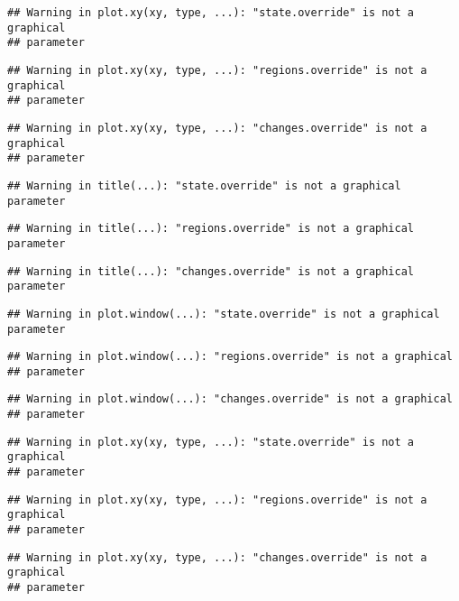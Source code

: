 \documentclass[]{book}
\theoremstyle{definition}
\theoremstyle{definition}
\theoremstyle{definition}
\theoremstyle{remark}
\begin{document}
\begin{verbatim}
## Warning in plot.xy(xy, type, ...): "state.override" is not a graphical
## parameter
\end{verbatim}

\begin{verbatim}
## Warning in plot.xy(xy, type, ...): "regions.override" is not a graphical
## parameter
\end{verbatim}

\begin{verbatim}
## Warning in plot.xy(xy, type, ...): "changes.override" is not a graphical
## parameter
\end{verbatim}

\begin{verbatim}
## Warning in title(...): "state.override" is not a graphical parameter
\end{verbatim}

\begin{verbatim}
## Warning in title(...): "regions.override" is not a graphical parameter
\end{verbatim}

\begin{verbatim}
## Warning in title(...): "changes.override" is not a graphical parameter
\end{verbatim}

\begin{verbatim}
## Warning in plot.window(...): "state.override" is not a graphical parameter
\end{verbatim}

\begin{verbatim}
## Warning in plot.window(...): "regions.override" is not a graphical
## parameter
\end{verbatim}

\begin{verbatim}
## Warning in plot.window(...): "changes.override" is not a graphical
## parameter
\end{verbatim}

\begin{verbatim}
## Warning in plot.xy(xy, type, ...): "state.override" is not a graphical
## parameter
\end{verbatim}

\begin{verbatim}
## Warning in plot.xy(xy, type, ...): "regions.override" is not a graphical
## parameter
\end{verbatim}

\begin{verbatim}
## Warning in plot.xy(xy, type, ...): "changes.override" is not a graphical
## parameter
\end{verbatim}
\end{document}
